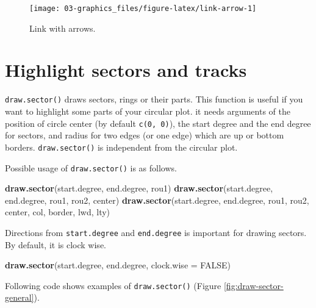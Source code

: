\documentclass[]{book}
\newenvironment{Shaded}{\begin{snugshade}}{\end{snugshade}}
\newcommand{\KeywordTok}[1]{\textcolor[rgb]{0.13,0.29,0.53}{\textbf{#1}}}
\newcommand{\DataTypeTok}[1]{\textcolor[rgb]{0.13,0.29,0.53}{#1}}
\newcommand{\OtherTok}[1]{\textcolor[rgb]{0.56,0.35,0.01}{#1}}
\newcommand{\NormalTok}[1]{#1}
\theoremstyle{definition}
\theoremstyle{definition}
\theoremstyle{remark}
\begin{document}
\begin{figure}

{\centering \texttt{[image: 03-graphics\_files/figure-latex/link-arrow-1]} 

}

\caption{Link with arrows.}\label{fig:link-arrow}
\end{figure}

\section{Highlight sectors and
tracks}\label{highlight-sectors-and-tracks}

\texttt{draw.sector()} draws sectors, rings or their parts. This
function is useful if you want to highlight some parts of your circular
plot. it needs arguments of the position of circle center (by default
\texttt{c(0,\ 0)}), the start degree and the end degree for sectors, and
radius for two edges (or one edge) which are up or bottom borders.
\texttt{draw.sector()} is independent from the circular plot.

Possible usage of \texttt{draw.sector()} is as follows.

\begin{Shaded}
\begin{Highlighting}[]
\KeywordTok{draw.sector}\NormalTok{(start.degree, end.degree, rou1)}
\KeywordTok{draw.sector}\NormalTok{(start.degree, end.degree, rou1, rou2, center)}
\KeywordTok{draw.sector}\NormalTok{(start.degree, end.degree, rou1, rou2, center, col, border, lwd, lty)}
\end{Highlighting}
\end{Shaded}

Directions from \texttt{start.degree} and \texttt{end.degree} is
important for drawing sectors. By default, it is clock wise.

\begin{Shaded}
\begin{Highlighting}[]
\KeywordTok{draw.sector}\NormalTok{(start.degree, end.degree, }\DataTypeTok{clock.wise =} \OtherTok{FALSE}\NormalTok{)}
\end{Highlighting}
\end{Shaded}

Following code shows examples of \texttt{draw.sector()} (Figure
\ref{fig:draw-sector-general}).
\end{document}
